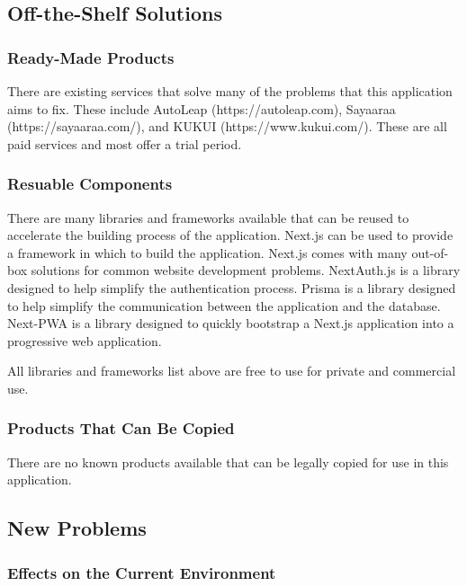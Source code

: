 \documentclass[12pt]{article}
\begin{document}
\subsection{Off-the-Shelf Solutions}

\subsubsection{Ready-Made Products}

There are existing services that solve many of the problems that this application aims to fix.
These include AutoLeap (https://autoleap.com), Sayaaraa (https://sayaaraa.com/), and KUKUI
(https://www.kukui.com/). These are all paid services and most offer a trial period.

\subsubsection{Resuable Components}

There are many libraries and frameworks available that can be reused to accelerate the building
process of the application. Next.js can be used to provide a framework in which to build the
application. Next.js comes with many out-of-box solutions for common website development problems.
NextAuth.js is a library designed to help simplify the authentication process. Prisma is a library
designed to help simplify the communication between the application and the database. Next-PWA is a
library designed to quickly bootstrap a Next.js application into a progressive web application.

All libraries and frameworks list above are free to use for private and commercial use.

\subsubsection{Products That Can Be Copied}

There are no known products available that can be legally copied for use in this application.

\subsection{New Problems}

\subsubsection{Effects on the Current Environment}
\end{document}
